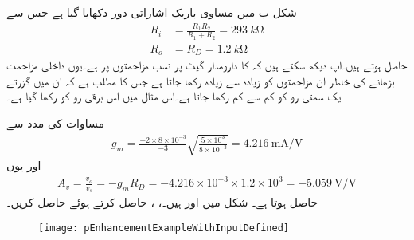 شکل  ب میں مساوی باریک اشاراتی دور دکھایا گیا ہے جس سے
\begin{align*}
R_i&=\frac{R_1 R_2}{R_1+R_2}=\SI{293}{k \ohm}\\
R_o&=R_D=\SI{1.2}{k \ohm}
\end{align*}
حاصل ہوتے ہیں۔آپ دیکھ سکتے ہیں کہ  کا دارومدار گیٹ پر نسب مزاحمتوں پر ہے۔یوں داخلی مزاحمت بڑھانے کی خاطر ان مزاحمتوں کو زیادہ سے زیادہ رکھا جاتا ہے جس کا مطلب ہے کہ ان میں گزرتے یک سمتی رو کو کم سے کم رکھا جاتا ہے۔اس مثال میں اس برقی رو کو   رکھا گیا ہے۔

مساوات  کی مدد سے
\begin{align*}
g_m=\frac{-2 \times 8 \times 10^{-3}}{-3} \sqrt{\frac{5 \times 10^{3}}{8 \times 10^{-3}}}=\SI[per=frac,fraction=nice]{4.216}{\milli \ampere \per \volt}
\end{align*}
اور یوں
\begin{align*}
A_v=\frac{v_o}{v_s}=-g_m R_D=-4.216 \times 10^{-3} \times 1.2 \times 10^3=\SI[per=frac,fraction=nice]{-5.059}{\volt \per \volt}
\end{align*}
حاصل ہوتا ہے۔
شکل  میں  اور  ہیں۔، ،  حاصل کرتے ہوئے  حاصل کریں۔ 

\begin{figure}
\centering
\texttt{[image: pEnhancementExampleWithInputDefined]}
\caption{}
\label{شکل_ماسفیٹ_جمع_ماسفیٹ_مثال_درکار_مداخل}
\end{figure}

